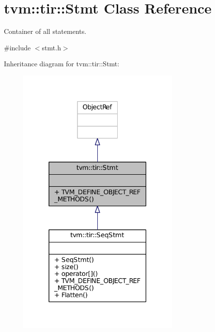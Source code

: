 \hypertarget{classtvm_1_1tir_1_1Stmt}{}\section{tvm\+:\+:tir\+:\+:Stmt Class Reference}
\label{classtvm_1_1tir_1_1Stmt}


Container of all statements.  




{\ttfamily \#include $<$stmt.\+h$>$}



Inheritance diagram for tvm\+:\+:tir\+:\+:Stmt\+:
\nopagebreak
\begin{figure}[H]
\begin{center}
\leavevmode
\includegraphics[width=230pt]{classtvm_1_1tir_1_1Stmt__inherit__graph}
\end{center}
\end{figure}


